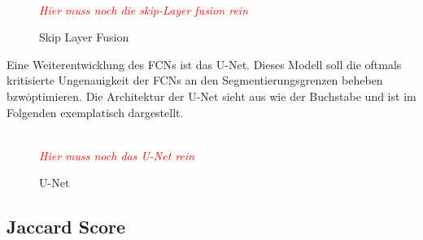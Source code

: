 \begin{figure}[H]
    \caption {Skip Layer Fusion}
    \label{fig:skiplayer}
    \\
    \textit{\textcolor{red}{Hier muss noch die skip-Layer fusion rein}}
    \\
\end{figure}

Eine Weiterentwicklung des \ac{FCN}s ist das U-Net.
Dieses Modell soll die oftmals kritisierte Ungenauigkeit der \ac{FCN}s an den Segmentierungsgrenzen beheben bzw\.
optimieren.
Die Architektur der U-Net sieht aus wie der Buchstabe \grqq und ist im Folgenden exemplatisch dargestellt.

\begin{figure}[H]
    \caption {U-Net}
    \label{fig:uNet}
    \\
    \textit{\textcolor{red}{Hier muss noch das U-Net rein}}
    \\
\end{figure}


\subsection{Jaccard Score}
